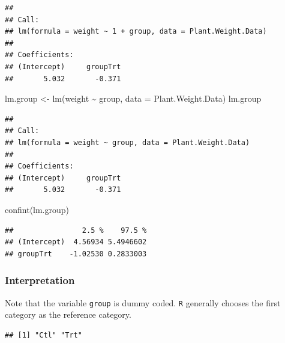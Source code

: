 \documentclass[
]{book}
\newenvironment{Shaded}{\begin{snugshade}}{\end{snugshade}}
\newcommand{\AttributeTok}[1]{\textcolor[rgb]{0.77,0.63,0.00}{#1}}
\newcommand{\FunctionTok}[1]{\textcolor[rgb]{0.00,0.00,0.00}{#1}}
\newcommand{\NormalTok}[1]{#1}
\newcommand{\OtherTok}[1]{\textcolor[rgb]{0.56,0.35,0.01}{#1}}
\newcommand{\SpecialCharTok}[1]{\textcolor[rgb]{0.00,0.00,0.00}{#1}}
\begin{document}
\begin{verbatim}
## 
## Call:
## lm(formula = weight ~ 1 + group, data = Plant.Weight.Data)
## 
## Coefficients:
## (Intercept)     groupTrt  
##       5.032       -0.371
\end{verbatim}

\begin{Shaded}
\begin{Highlighting}[]
\NormalTok{lm.group }\OtherTok{\textless{}{-}} \FunctionTok{lm}\NormalTok{(weight }\SpecialCharTok{\textasciitilde{}}\NormalTok{ group, }\AttributeTok{data =}\NormalTok{ Plant.Weight.Data)}
\NormalTok{lm.group}
\end{Highlighting}
\end{Shaded}

\begin{verbatim}
## 
## Call:
## lm(formula = weight ~ group, data = Plant.Weight.Data)
## 
## Coefficients:
## (Intercept)     groupTrt  
##       5.032       -0.371
\end{verbatim}

\begin{Shaded}
\begin{Highlighting}[]
\FunctionTok{confint}\NormalTok{(lm.group)}
\end{Highlighting}
\end{Shaded}

\begin{verbatim}
##                2.5 %    97.5 %
## (Intercept)  4.56934 5.4946602
## groupTrt    -1.02530 0.2833003
\end{verbatim}

\hypertarget{interpretation}{%
\subsubsection{Interpretation}\label{interpretation}}

Note that the variable \texttt{group} is dummy coded. \texttt{R} generally chooses the first category as the reference category.

\begin{Shaded}
\end{Shaded}

\begin{verbatim}
## [1] "Ctl" "Trt"
\end{verbatim}
\end{document}

